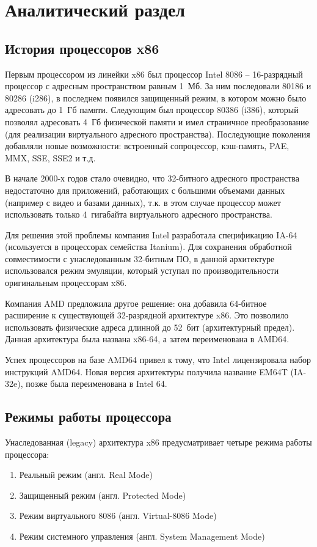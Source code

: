 \chapter{Аналитический раздел}
\label{cha:analysis}

\section{История процессоров x86}
Первым процессором из линейки x86 был процессор Intel 8086 -- 16-разрядный процессор с адресным пространством
равным 1~Мб. За ним последовали 80186 и 80286 (i286), в последнем появился защищенный режим, в котором можно
было адресовать до 1~Гб памяти. Следующим был процессор 80386 (i386), который позволял адресовать 4~Гб физической
памяти и имел страничное преобразование (для реализации виртуального адресного пространства). Последующие
поколения добавляли новые возможности: встроенный сопроцессор, кэш-память, PAE, MMX, SSE, SSE2 и т.д.

В начале 2000-х годов стало очевидно, что 32-битного адресного пространства недостаточно для приложений,
работающих с большими объемами данных (например с видео и базами данных), т.к. в этом случае процессор
может использовать только 4~гигабайта виртуального адресного пространства.

Для решения этой проблемы компания Intel разработала спецификацию IA-64 (исользуется в процессорах семейства
Itanium). Для сохранения обработной совместимости с унаследованным 32-битным ПО, в данной архитектуре использовался
режим эмуляции, который уступал по производительности оригинальным процессорам x86.

Компания AMD предложила другое решение: она добавила 64-битное расширение к существующей 32-разрядной архитектуре x86.
Это позволило использовать физические адреса длинной до 52~бит (архитектурный предел). Данная архитектура была
названа x86-64, а затем переименована в AMD64.

Успех процессоров на базе AMD64 привел к тому, что Intel лицензировала набор инструкций AMD64. Новая версия архитектуры
получила название EM64T (IA-32e), позже была переименована в Intel 64.


\section{Режимы работы процессора}
Унаследованная (legacy) архитектура x86 предусматривает четыре режима работы процессора:
\begin{enumerate}[1.]
	\item Реальный режим (англ. Real Mode)
	\item Защищенный режим (англ. Protected Mode)
	\item Режим виртуального 8086 (англ. Virtual-8086 Mode)
	\item Режим системного управления (англ. System Management Mode)
\end{enumerate}

